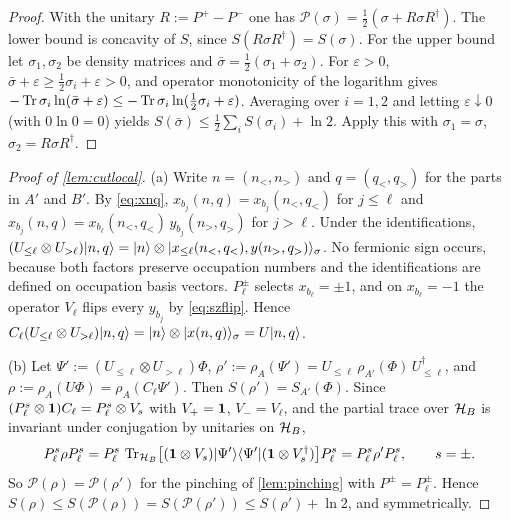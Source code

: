 \begin{proof}
With the unitary $R:=P^+-P^-$ one has $\mathcal{P}(\sigma)=\frac12(\sigma+R\sigma R^\dagger)$.  The lower
bound is concavity of $S$, since $S(R\sigma R^\dagger)=S(\sigma)$.  For the upper bound let
$\sigma_1,\sigma_2$ be density matrices and $\bar\sigma=\frac12(\sigma_1+\sigma_2)$.  For $\varepsilon>0$,
$\bar\sigma+\varepsilon\ge\frac12\sigma_i+\varepsilon>0$, and operator monotonicity of the logarithm gives
$-\operatorname{Tr}\sigma_i\ln(\bar\sigma+\varepsilon)\le-\operatorname{Tr}\sigma_i\ln(\tfrac12\sigma_i+\varepsilon)$.  Averaging over
$i=1,2$ and letting $\varepsilon\downarrow0$ (with $0\ln0=0$) yields
$S(\bar\sigma)\le\frac12\sum_iS(\sigma_i)+\ln2$.  Apply this with $\sigma_1=\sigma$, $\sigma_2=R\sigma R^\dagger$.
\end{proof}

\begin{proof}[Proof of \cref{lem:cutlocal}]
(a) Write $n=(n_<,n_>)$ and $q=(q_<,q_>)$ for the parts in $A'$ and $B'$.  By \eqref{eq:xnq},
$x_{b_j}(n,q)=x_{b_j}(n_<,q_<)$ for $j\le\ell$ and $x_{b_j}(n,q)=x_{b_\ell}(n_<,q_<)\,y_{b_j}(n_>,q_>)$
for $j>\ell$.  Under the identifications, $(U_{\le\ell}\otimes U_{>\ell})|n,q\rangle=|n\rangle\otimes|x_{\le\ell}(n_<,q_<),y(n_>,q_>)\rangle_\sigma$.
No fermionic sign occurs, because both factors preserve occupation numbers and the identifications
are defined on occupation basis vectors.  $P^\pm_\ell$ selects $x_{b_\ell}=\pm1$, and on
$x_{b_\ell}=-1$ the operator $V_\ell$ flips every $y_{b_j}$ by \eqref{eq:szflip}.  Hence
$C_\ell(U_{\le\ell}\otimes U_{>\ell})|n,q\rangle=|n\rangle\otimes|x(n,q)\rangle_\sigma=U|n,q\rangle$.

(b) Let $\Psi':=(U_{\le\ell}\otimes U_{>\ell})\Phi$, $\rho':=\rho_A(\Psi')=U_{\le\ell}\,\rho_{A'}(\Phi)\,U_{\le\ell}^\dagger$,
and $\rho:=\rho_A(U\Phi)=\rho_A(C_\ell\Psi')$.  Then $S(\rho')=S_{A'}(\Phi)$.  Since
$(P^s_\ell\otimes\mathbf{1})C_\ell=P^s_\ell\otimes V_s$ with $V_+=\mathbf{1}$, $V_-=V_\ell$, and the partial trace over
$\mathcal{H}_B$ is invariant under conjugation by unitaries on $\mathcal{H}_B$,
\[
  P^s_\ell\rho P^s_\ell=P^s_\ell\,\operatorname{Tr}_{\mathcal{H}_B}\bigl[(\mathbf{1}\otimes V_s)|\Psi'\rangle\langle \Psi'|(\mathbf{1}\otimes V_s^\dagger)\bigr]P^s_\ell
  =P^s_\ell\rho'P^s_\ell,\qquad s=\pm .
\]
So $\mathcal{P}(\rho)=\mathcal{P}(\rho')$ for the pinching of \cref{lem:pinching} with $P^\pm=P^\pm_\ell$.
Hence $S(\rho)\le S(\mathcal{P}(\rho))=S(\mathcal{P}(\rho'))\le S(\rho')+\ln2$, and symmetrically.


\end{proof}
